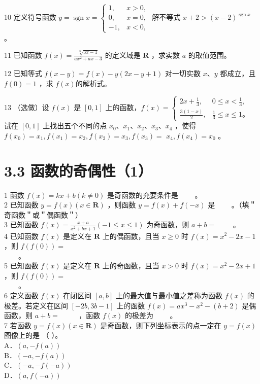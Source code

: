 \documentclass[10pt]{article}
\begin{document}
10 定义符号函数 \(y=\operatorname{sgn} x=\left\{\begin{array}{ll}1, & x>0, \\ 0, & x=0, \\ -1, & x<0,\end{array}\right.\) 解不等式 \(x+2>(x-2)^{\operatorname{sgn} x}\) 。

11 已知函数 \(f(x)=\frac{\sqrt[3]{3 x-1}}{a x^{2}+a x-3}\) 的定义域是 \(\mathbf{R}\) ，求实数 \(a\) 的取值范围。

12 已知等式 \(f(x-y)=f(x)-y(2 x-y+1)\) 对一切实数 \(x 、 y\) 都成立，且 \(f(0)=1\) ，求 \(f(x)\)的解析式。

13 （选做）设 \(f(x)\) 是 \([0,1]\) 上的函数，\(f(x)=\left\{\begin{array}{ll}2 x+\frac{1}{3}, & 0 \leqslant x<\frac{1}{3}, \\ \frac{3(1-x)}{2}, & \frac{1}{3} \leqslant x \leqslant 1 。\end{array}\right.\) 试在 \([0,1]\) 上找出五个不同的点 \(x_{0} 、 x_{1} 、 x_{2} 、 x_{3} 、 x_{4}\) ，使得 \(f\left(x_{0}\right)=x_{1}, f\left(x_{1}\right)=x_{2}, f\left(x_{2}\right)=x_{3}, f\left(x_{3}\right)=\) \(x_{4}, f\left(x_{4}\right)=x_{0}\) 。

\section*{3.3 函数的奇偶性（1）}
1 函数 \(f(x)=k x+b(k \neq 0)\) 是奇函数的充要条件是 \(\qquad\)。\\
2 已知函数 \(y=f(x)(x \in \mathbf{R})\) ，则函数 \(y=f(x)+f(-x)\) 是 \(\qquad\)。（填＂奇函数＂或＂偶函数＂）\\
3 已知函数 \(f(x)=\frac{x+a}{x^{2}+b x+1}(-1 \leqslant x \leqslant 1)\) 为奇函数，则 \(a+b=\) \(\qquad\)。\\
4 已知函数 \(f(x)\) 是定义在 \(\mathbf{R}\) 上的偶函数，且当 \(x \geqslant 0\) 时 \(f(x)=x^{2}-2 x-1\) ，则 \(f(f(0))=\)\\
\(\qquad\)。\\
5 已知函数 \(f(x)\) 是定义在 \(\mathbf{R}\) 上的奇函数，且当 \(x>0\) 时 \(f(x)=x^{2}-2 x+1\) ，则 \(f(f(0))=\)\\
\(\qquad\)。\\
6 定义函数 \(f(x)\) 在闭区间 \([a, b]\) 上的最大值与最小值之差称为函数 \(f(x)\) 的极差。若定义在区间 \([-2 b, 3 b-1]\) 上的函数 \(f(x)=a x^{3}-x^{2}-(b+2)\) 是偶函数，则 \(a+b=\) \(\qquad\) ，函数 \(f(x)\) 的极差为 \(\qquad\)。\\
7 若函数 \(y=f(x)(x \in \mathbf{R})\) 是奇函数，则下列坐标表示的点一定在 \(y=f(x)\) 图像上的是 （ ）。\\
A．\((a,-f(a))\)\\
B．\((-a,-f(a))\)\\
C．\((-a,-f(-a))\)\\
D．\((a, f(-a))\)
\end{document}
